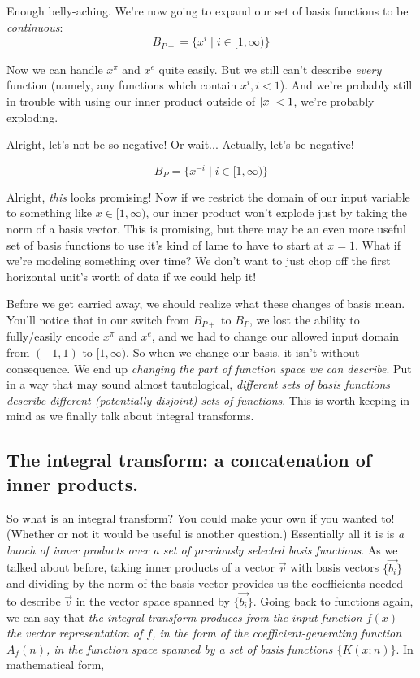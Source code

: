 \documentclass[../main/main.tex]{subfiles}
\begin{document}
Enough belly-aching. We're now going to expand our
set of basis functions to be \emph{continuous}:
\[B_{P+} = \{x^i \mid i \in [1, \infty)\} \] 

Now we can handle \(x^\pi\) and \(x^e\) quite easily.
But we still can't describe \emph{every} function (namely,
any functions which contain \(x^i, i < 1\)).
And we're probably still in trouble with using our
inner product \textemdash{} outside of \(\abs{x} < 1\),
we're probably exploding.\par

Alright, let's not be so negative! Or wait... 
Actually, let's be negative!

\[B_{P} = \{x^{-i} \mid i \in [1, \infty)\} \] 

Alright, \emph{this} looks promising! Now if we restrict
the domain of our input variable to 
something like \(x \in [1, \infty)\),
our inner product
won't explode just by taking the norm of a basis vector.
This is promising, but there may be an even more useful
set of basis functions to use \textemdash{} it's kind of
lame to have to start at \(x=1\). What if we're modeling
something over time? We don't want to just chop
off the first horizontal unit's worth of data if we 
could help it! \par

Before we get carried away, we should realize what these
changes of basis mean. You'll notice that in our switch
from \(B_{P+}\) to \(B_{P}\), we lost the ability to
fully/easily encode \(x^\pi\) and \(x^e\), and we
had to change our allowed input domain from \((-1,1)\)
to \([1, \infty)\). So when we change our basis, it
isn't without consequence. We end up
\emph{changing the part of function space we can describe}. 
Put in a way that may sound almost tautological,
\emph{different sets of basis functions
describe different (potentially disjoint) sets of functions}.
This is worth keeping in mind as we finally talk about
integral transforms.


\subsection{The integral transform: a concatenation of inner products.}

So what is an integral transform?
You could make your own if you wanted to!
(Whether or not it would be useful is another question.)
Essentially all it is is \emph{a bunch of inner products
over a set of previously selected basis functions}.
As we talked about before, taking inner products of
a vector \(\vec{v}\)
with basis vectors \(\{\vec{b_i}\}\)
and dividing by the norm of the basis vector
provides us the coefficients needed to describe \(\vec{v}\)
in the vector space spanned by \(\{\vec{b_i}\}\).
Going back to functions again, 
we can say that \emph{the integral transform
produces from the input function \(f(x)\)
the vector representation of \(f\),
in the form of the coefficient-generating function \(A_f(n)\),
in the function space spanned by a set of basis functions
\(\{K(x;n)\}\)}. In mathematical form,
\end{document}
